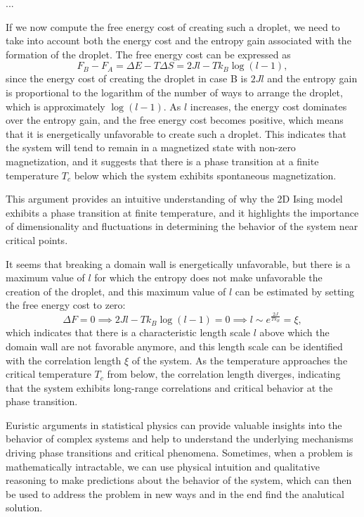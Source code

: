 \begin{remark}
    ...
\end{remark}

If we now compute the free energy cost of creating such a droplet, we need to take into account both the energy cost and the entropy gain associated with the formation of the droplet. The free energy cost can be expressed as
\[
    F_B - F_A = \Delta E - T \Delta S = 2 J l - T k_B \log(l-1),
\]
since the energy cost of creating the droplet in case B is \(2 J l\) and the entropy gain is proportional to the logarithm of the number of ways to arrange the droplet, which is approximately \(\log(l-1)\). As \(l\) increases, the energy cost dominates over the entropy gain, and the free energy cost becomes positive, which means that it is energetically unfavorable to create such a droplet. This indicates that the system will tend to remain in a magnetized state with non-zero magnetization, and it suggests that there is a phase transition at a finite temperature \(T_c\) below which the system exhibits spontaneous magnetization.

This argument provides an intuitive understanding of why the 2D Ising model exhibits a phase transition at finite temperature, and it highlights the importance of dimensionality and fluctuations in determining the behavior of the system near critical points.

It seems that breaking a domain wall is energetically unfavorable, but there is a maximum value of \(l\) for which the entropy does not make unfavorable the creation of the droplet, and this maximum value of \(l\) can be estimated by setting the free energy cost to zero:
\[
    \Delta F = 0 \implies 2 J l - T k_B \log(l-1) = 0 \implies l \sim e^{\frac{2 J}{T k_B}} = \xi,
\]
which indicates that there is a characteristic length scale \(l\) above which the domain wall are not favorable anymore, and this length scale can be identified with the correlation length \(\xi\) of the system. As the temperature approaches the critical temperature \(T_c\) from below, the correlation length diverges, indicating that the system exhibits long-range correlations and critical behavior at the phase transition.

Euristic arguments in statistical physics can provide valuable insights into the behavior of complex systems and help to understand the underlying mechanisms driving phase transitions and critical phenomena. Sometimes, when a problem is mathematically intractable, we can use physical intuition and qualitative reasoning to make predictions about the behavior of the system, which can then be used to address the problem in new ways and in the end find the analutical solution.

